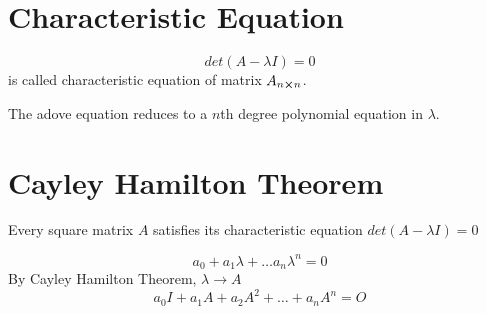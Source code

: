 \documentclass{article}
\begin{document}
\section{Characteristic Equation}
$$det(A-\lambda I)=0$$
is called characteristic equation of matrix $A_{n \cross n}$.

The adove equation reduces to a $n$th degree polynomial equation in $\lambda$.

\section{Cayley Hamilton Theorem}
Every square matrix $A$ satisfies its characteristic equation $det(A-\lambda I)=0$

$$a_{0}+a_{1}\lambda+\ldots a_{n}\lambda^n=0$$
By Cayley Hamilton Theorem, $\lambda \to A$
$$a_{0}I+a_{1}A+a_{2}A^2+\ldots+a_{n}A^n=O$$
\end{document}
